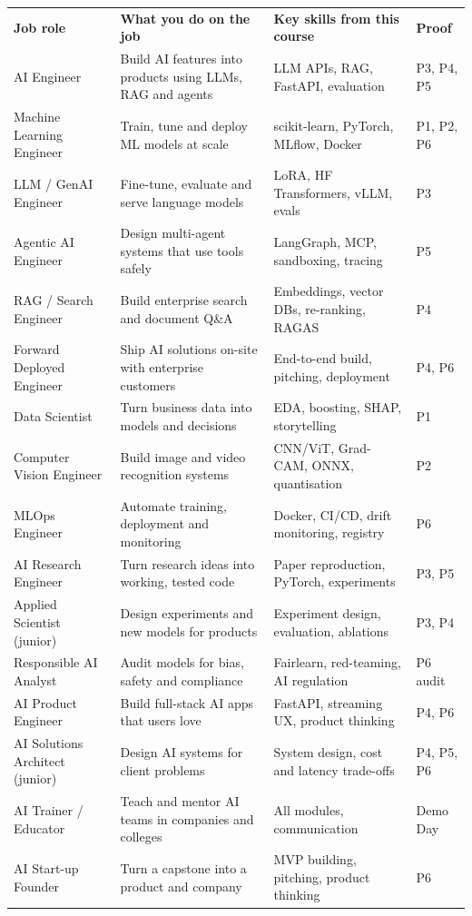 \documentclass[11pt,a4paper]{article}
\begin{document}
\footnotesize
{}
\begin{tabularx}{\linewidth}{@{}L{3.3cm} Y L{4.2cm} L{1.5cm}@{}}
\color{gold}\sffamily\bfseries Job role & \color{gold}\sffamily\bfseries What you do on the job & \color{gold}\sffamily\bfseries Key skills from this course & \color{gold}\sffamily\bfseries Proof\\
AI Engineer & Build AI features into products using LLMs, RAG and agents & LLM APIs, RAG, FastAPI, evaluation & P3, P4, P5\\
Machine Learning Engineer & Train, tune and deploy ML models at scale & scikit-learn, PyTorch, MLflow, Docker & P1, P2, P6\\
LLM / GenAI Engineer & Fine-tune, evaluate and serve language models & LoRA, HF Transformers, vLLM, evals & P3\\
Agentic AI Engineer & Design multi-agent systems that use tools safely & LangGraph, MCP, sandboxing, tracing & P5\\
RAG / Search Engineer & Build enterprise search and document Q\&A & Embeddings, vector DBs, re-ranking, RAGAS & P4\\
Forward Deployed Engineer & Ship AI solutions on-site with enterprise customers & End-to-end build, pitching, deployment & P4, P6\\
Data Scientist & Turn business data into models and decisions & EDA, boosting, SHAP, storytelling & P1\\
Computer Vision Engineer & Build image and video recognition systems & CNN/ViT, Grad-CAM, ONNX, quantisation & P2\\
MLOps Engineer & Automate training, deployment and monitoring & Docker, CI/CD, drift monitoring, registry & P6\\
AI Research Engineer & Turn research ideas into working, tested code & Paper reproduction, PyTorch, experiments & P3, P5\\
Applied Scientist (junior) & Design experiments and new models for products & Experiment design, evaluation, ablations & P3, P4\\
Responsible AI Analyst & Audit models for bias, safety and compliance & Fairlearn, red-teaming, AI regulation & P6 audit\\
AI Product Engineer & Build full-stack AI apps that users love & FastAPI, streaming UX, product thinking & P4, P6\\
AI Solutions Architect (junior) & Design AI systems for client problems & System design, cost and latency trade-offs & P4, P5, P6\\
AI Trainer / Educator & Teach and mentor AI teams in companies and colleges & All modules, communication & Demo Day\\
AI Start-up Founder & Turn a capstone into a product and company & MVP building, pitching, product thinking & P6\\
\end{tabularx}
\normalsize
\end{document}
